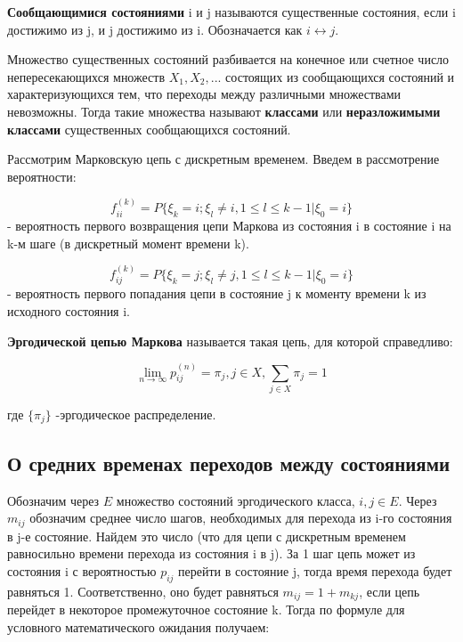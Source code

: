 \par\medskip
\textbf{Сообщающимися состояниями} i и j называются существенные состояния, если i достижимо из j, и j достижимо из i. Обозначается как $i \leftrightarrow j$.
\par\medskip
Множество существенных состояний разбивается на конечное или счетное число непересекающихся множеств $X_1, X_2, ...$ состоящих из сообщающихся состояний и характеризующихся тем, что переходы между различными множествами невозможны.
Тогда такие множества называют \textbf{классами} или \textbf{неразложимыми классами} существенных сообщающихся состояний. 

\par\medskip
Рассмотрим Марковскую цепь с дискретным временем. Введем в рассмотрение вероятности:

$$f_{ii}^(k) = P\{\xi_k = i; \xi_l \neq i, 1 \leq l \leq k - 1 | \xi_0 = i\}$$ - вероятность первого возвращения цепи Маркова из состояния i в состояние i на k-м шаге (в дискретный момент времени k). 

$$f_{ij}^(k) = P\{\xi_k = j; \xi_l \neq j, 1 \leq l \leq k - 1 | \xi_0 = i\}$$ - вероятность первого попадания цепи в состояние j к моменту времени k из исходного состояния i.

\par\medskip

\textbf{Эргодической цепью Маркова} называется такая цепь, для которой справедливо:

$$\lim_{n \to \infty} p_{ij}^{(n)}  = \pi_{j}, j \in X, \sum_{j \in X} \pi_j = 1$$

где $\{\pi_j \}$ -эргодическое распределение.

\subsection{О средних временах переходов между состояниями} 

Обозначим через $E$ множество состояний эргодического класса, $i,j \in E$. Через $m_{ij}$ обозначим среднее число шагов, необходимых для перехода из i-го состояния в j-е состояние. Найдем это число (что для цепи с дискретным временем равносильно времени перехода из состояния i в j).
За 1 шаг цепь может из состояния i с вероятностью $p_{ij}$ перейти в состояние j, тогда время перехода будет равняться 1. Соответственно, оно будет равняться $m_{ij} = 1 + m_{kj}$, если цепь перейдет в некоторое промежуточное состояние k.
Тогда по формуле для условного математического ожидания получаем:


